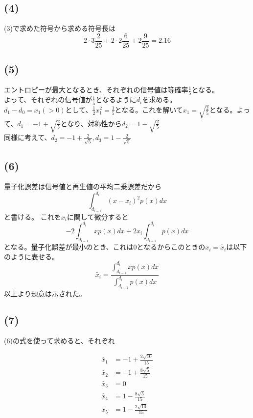 \documentclass[a4paper,12pt,xelatex,ja=standard]{bxjsarticle}
\begin{document}
  \subsection*{(4)}
  (3)で求めた符号から求める符号長は
  \[
    2 \cdot 3 \frac{2}{25} + 2 \cdot 2 \frac{6}{25} + 2 \frac{9}{25} = 2.16
  \]

  \subsection*{(5)}
  エントロピーが最大となるとき、それぞれの信号値は等確率$\frac{1}{5}$となる。\\
  よって、それぞれの信号値が$\frac{1}{5}$となるように$d_i$を求める。\\
  $d_1 - d_0 = x_1(>0)$として、$\frac{1}{2}x_1^2 = \frac{1}{5}$となる。これを解いて$x_1 = \sqrt{\frac{2}{5}}$となる。よって、$d_1 = -1 + \sqrt{\frac{2}{5}}$となり、対称性から$d_2 = 1 - \sqrt{\frac{2}{5}}$\\
  同様に考えて、$d_2 = -1 + \frac{2}{\sqrt{5}}, d_3 = 1 - \frac{2}{\sqrt{5}}$
  \subsection*{(6)}
  量子化誤差は信号値と再生値の平均二乗誤差だから
  \[
    \int^{d_i}_{d_{i-1}}(x - x_i)^2 p(x) dx
  \]
  と書ける。
  これを$x_i$に関して微分すると
  \[
    -2 \int^{d_i}_{d_{i-1}}x p(x) dx + 2 x_i \int^{d_i}_{d_{i-1}} p(x) dx
  \]
  となる。量子化誤差が最小のとき、これは0となるからこのときの$x_i=\tilde{x_i}$は以下のように表せる。
  \[
    \tilde{x_i} = \frac{\int^{d_i}_{d_{i-1}} x p(x) dx}{\int^{d_i}_{d_{i-1}} p(x) dx}
  \]
  以上より題意は示された。

  \subsection*{(7)}
  (6)の式を使って求めると、それぞれ

  \begin{equation*}
    \begin{split}
      \tilde{x_1} &= -1 + \frac{2\sqrt{10}}{15}\\
      \tilde{x_2} &= -1 + \frac{8\sqrt{5}}{15}\\
      \tilde{x_3} &= 0\\
      \tilde{x_4} &= 1 - \frac{8\sqrt{5}}{15}\\
      \tilde{x_5} &= 1 - \frac{2\sqrt{10}}{15}
    \end{split}
  \end{equation*}
\end{document}
